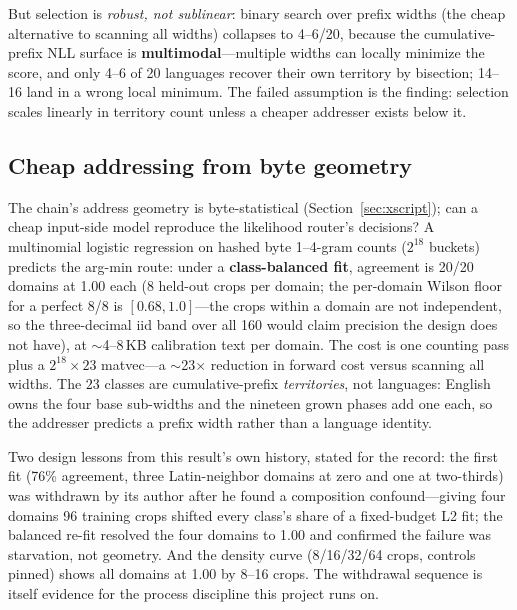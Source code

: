 \documentclass[11pt]{article}
\theoremstyle{definition}\newtheorem{definition}{Definition}
\theoremstyle{remark}\newtheorem{remark}{Remark}
\begin{document}
But selection is \emph{robust, not sublinear}: binary search over prefix widths (the
cheap alternative to scanning all widths) collapses to 4--6/20, because the
cumulative-prefix NLL surface is \textbf{multimodal}---multiple widths can locally
minimize the score, and only 4--6 of 20 languages recover their own territory by bisection; 14--16 land in a wrong local minimum. The failed
assumption is the finding: selection scales linearly in territory count unless a cheaper
addresser exists below it.

\subsection{Cheap addressing from byte geometry}

The chain's address geometry is byte-statistical (Section~\ref{sec:xscript}); can a cheap
input-side model reproduce the likelihood router's decisions? A multinomial logistic
regression on hashed byte 1--4-gram counts ($2^{18}$ buckets) predicts the arg-min route:
under a \textbf{class-balanced fit}, agreement is 20/20 domains at 1.00 each (8 held-out
crops per domain; the per-domain Wilson floor for a perfect 8/8 is $[0.68, 1.0]$---the crops
within a domain are not independent, so the three-decimal iid band over all 160 would claim
precision the design does not have), at $\sim$4--8\,KB calibration text per domain. The cost is one
counting pass plus a $2^{18}\times 23$ matvec---a $\sim$23$\times$ reduction in forward
cost versus scanning all widths. The $23$ classes are cumulative-prefix
\emph{territories}, not languages: English owns the four base sub-widths and the nineteen
grown phases add one each, so the addresser predicts a prefix width rather than a
language identity.

Two design lessons from this result's own history, stated for the record: the first fit
(76\% agreement, three Latin-neighbor domains at zero and one at two-thirds) was withdrawn by its author after
he found a composition confound---giving four domains 96 training crops shifted every
class's share of a fixed-budget L2 fit; the balanced re-fit resolved the four domains to
1.00 and confirmed the failure was starvation, not geometry. And the density curve
(8/16/32/64 crops, controls pinned) shows all domains at 1.00 by 8--16 crops. The
withdrawal sequence is itself evidence for the process discipline this project runs on.
\end{document}
